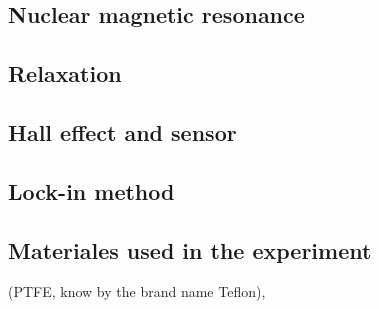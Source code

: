\subsection{Nuclear magnetic resonance}
\subsection{Relaxation}
\subsection{Hall effect and sensor}
\subsection{Lock-in method}


\subsection{Materiales used in the experiment}

(PTFE, know by the brand name Teflon), 
